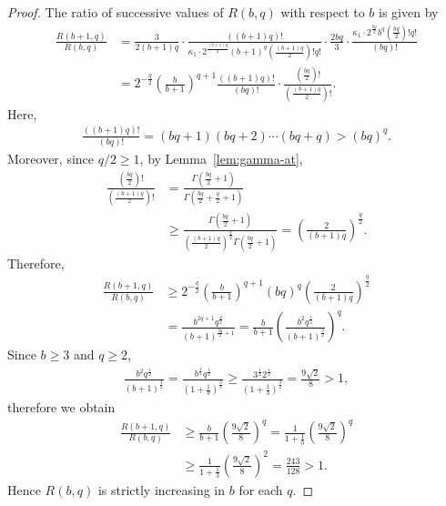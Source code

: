 \documentclass[12pt,reqno]{amsart}
\newcommand{\f}[2]{\frac{#1}{#2}}							%
\theoremstyle{mythmstyle}
\theoremstyle{mydefstyle}
\newcommand{\lemref}[1]{Lemma~\ref{#1}}
\numberwithin{equation}{section}
\begin{document}
\begin{proof}
The ratio of successive values of $R(b, q)$ with respect to $b$ is given by
\begin{align}
\f{R(b+1, q)}{R(b, q)} &= \f{3}{2(b+1)q}\cdot\f{((b+1)q)!}{\kappa_{1}\cdot 2^{\f{(b+1)q}{2}}(b+1)^{q}\left(\f{(b+1)q}{2}\right)!q!}\cdot
\f{2bq}{3}\cdot\f{\kappa_{1}\cdot 2^{\f{bq}{2}}b^{q}\left(\f{bq}{2}\right)!q!}{(bq)!} \\
&= 2^{-\f{q}{2}}\left(\f{b}{b+1}\right)^{q+1}\f{((b+1)q)!}{(bq)!}\cdot
\f{\left(\f{bq}{2}\right)!}{\left(\f{(b+1)q}{2}\right)!}.
\end{align}
Here,
\begin{align}
\f{((b+1)q)!}{(bq)!} = (bq+1)(bq+2)\cdots(bq+q) > (bq)^{q}. 
\end{align}
Moreover, since $q/2 \ge 1$, by \lemref{lem:gamma-at},
\begin{align}
\f{\left(\f{bq}{2}\right)!}{\left(\f{(b+1)q}{2}\right)!} &= \f{\Gamma\left(\f{bq}{2}+1\right)}{\Gamma\left(\f{bq}{2}+\f{q}{2}+1\right)} \\
&\ge \f{\Gamma\left(\f{bq}{2}+1\right)}{\left(\f{(b+1)q}{2}\right)^{\f{q}{2}}\Gamma\left(\f{bq}{2}+1\right)}
= \left(\f{2}{(b+1)q}\right)^{\f{q}{2}}.
\end{align}
Therefore,
\begin{align}
\f{R(b+1, q)}{R(b, q)} &\ge 2^{-\f{q}{2}}\left(\f{b}{b+1}\right)^{q+1}(bq)^{q}\left(\f{2}{(b+1)q}\right)^{\f{q}{2}} \\
&= \frac{b^{2q+1}q^{\f{q}{2}}}{(b+1)^{\f{3q}{2}+1}}
= \f{b}{b+1}\left(\f{b^{2}q^{\f{1}{2}}}{(b+1)^{\f{3}{2}}}\right)^{q}.
\end{align}
Since $b \ge 3$ and $q \ge 2$,
\begin{align}
\f{b^{2}q^{\f{1}{2}}}{(b+1)^{\f{3}{2}}} = \f{b^{\f{1}{2}}q^{\f{1}{2}}}{(1+\f{1}{b})^{\f{3}{2}}}
\ge \f{3^{\f{1}{2}}2^{\f{1}{2}}}{(1+\f{1}{3})^{\f{3}{2}}} = \f{9\sqrt{2}}{8} > 1,
\end{align}
therefore we obtain
\begin{align}
\f{R(b+1, q)}{R(b, q)} &\ge \f{b}{b+1}\left(\f{9\sqrt{2}}{8}\right)^{q} = \f{1}{1+\f{1}{b}}\left(\f{9\sqrt{2}}{8}\right)^{q} \\
&\ge \f{1}{1+\f{1}{3}}\left(\f{9\sqrt{2}}{8}\right)^{2} = \f{243}{128} > 1.
\end{align}
Hence $R(b, q)$ is strictly increasing in $b$ for each $q$.


\end{proof}
\end{document}
